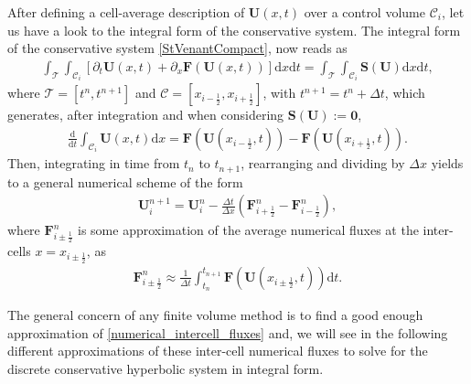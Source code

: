 \documentclass[a4paper]{article}
\numberwithin{equation}{section}
\begin{document}
	After defining a cell-average description of $\mathbf{U}(x,t)$ over a control volume $\mathcal{C}_i$, let us have a look to the integral form of the conservative system. The integral form of the conservative system \ref{StVenantCompact}, now reads as
	\begin{align}
	\int_{\mathcal{T}}\int_{\mathcal{C}_i} [\partial_t \mathbf{U}(x,t)+\partial_x \mathbf{F}(\mathbf{U}(x,t))] \mathrm{d}x \mathrm{d}t = \int_{\mathcal{T}}\int_{\mathcal{C}_i} \mathbf{S(U)} \mathrm{d}x \mathrm{d}t,
	\end{align}	
	where $\mathcal{T}=[t^n,t^{n+1}]$ and $\mathcal{C}=[x_{i-\frac{1}{2}},x_{i+\frac{1}{2}}]$, with $t^{n+1}=t^n+\Delta t$, which generates, after integration and when considering $\mathbf{S(U)}:=\mathbf{0}$, 
	\begin{align}
		\frac{\mathrm{d}}{\mathrm{d}t} \int_{\mathcal{C}_i} \mathbf{U}(x,t) \mathrm{d}x = \mathbf{F}(\mathbf{U}(x_{i-\frac{1}{2}},t)) - \mathbf{F}(\mathbf{U}(x_{i+\frac{1}{2}},t)).
	\end{align}
	Then, integrating in time from $t_n$ to $t_{n+1}$, rearranging and dividing by $\Delta x$ yields to a general numerical scheme of the form
	\begin{align}
		\label{conservative_numerical_scheme}
		\mathbf{U}_i^{n+1} = \mathbf{U}_i^{n} - \frac{\Delta t}{\Delta x}( \mathbf{F}_{i+\frac{1}{2}}^n - \mathbf{F}_{i-\frac{1}{2}}^n ),
	\end{align}
	where $\mathbf{F}_{i\pm\frac{1}{2}}^n$ is some approximation of the average numerical fluxes at the inter-cells $x=x_{i\pm\frac{1}{2}}$, as
	\begin{align}
		\label{numerical_intercell_fluxes}
		\mathbf{F}_{i\pm\frac{1}{2}}^n \approx \frac{1}{\Delta t} \int_{t_n}^{t_{n+1}} \mathbf{F}(\mathbf{U}(x_{i\pm\frac{1}{2}},t))\mathrm{d}t.
	\end{align}

	The general concern of any finite volume method is to find a good enough approximation of \ref{numerical_intercell_fluxes} and, we will see in the following different approximations of these inter-cell numerical fluxes to solve for the discrete conservative hyperbolic system in integral form.
\end{document}
